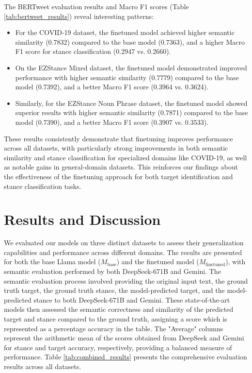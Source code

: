 \documentclass[twocolumn,11pt,letterpaper]{article}
\begin{document}
The BERTweet evaluation results and Macro F1 scores (Table \ref{tab:bertweet_results}) reveal interesting patterns:

\begin{itemize}
    \item For the COVID-19 dataset, the finetuned model achieved higher semantic similarity (0.7832) compared to the base model (0.7363), and a higher Macro F1 score for stance classification (0.2947 vs. 0.2660).
    \item On the EZStance Mixed dataset, the finetuned model demonstrated improved performance with higher semantic similarity (0.7779) compared to the base model (0.7392), and a better Macro F1 score (0.3964 vs. 0.3624).
    \item Similarly, for the EZStance Noun Phrase dataset, the finetuned model showed superior results with higher semantic similarity (0.7871) compared to the base model (0.7390), and a better Macro F1 score (0.3907 vs. 0.3533).
\end{itemize}

These results consistently demonstrate that finetuning improves performance across all datasets, with particularly strong improvements in both semantic similarity and stance classification for specialized domains like COVID-19, as well as notable gains in general-domain datasets. This reinforces our findings about the effectiveness of the finetuning approach for both target identification and stance classification tasks.

\section{Results and Discussion}
\label{sec:results}

We evaluated our models on three distinct datasets to assess their generalization capabilities and performance across different domains. The results are presented for both the base Llama model ($M_{\text{base}}$) and the finetuned model ($M_{\text{finetuned}}$), with semantic evaluation performed by both DeepSeek-671B and Gemini. 
The semantic evaluation process involved providing the original input text, the ground truth target, the ground truth stance, the model-predicted target, and the model-predicted stance to both DeepSeek-671B and Gemini. These state-of-the-art models then assessed the semantic correctness and similarity of the predicted target and stance compared to the ground truth, assigning a score which is represented as a percentage accuracy in the table. The "Average" columns represent the arithmetic mean of the scores obtained from DeepSeek and Gemini for stance and target accuracy, respectively, providing a balanced measure of performance.
Table \ref{tab:combined_results} presents the comprehensive evaluation results across all datasets.
\end{document}
